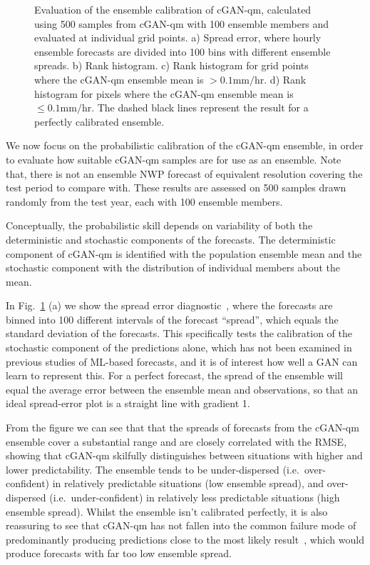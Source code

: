 \documentclass{article}
\begin{document}
\begin{figure}
     
     \caption{Evaluation of the ensemble calibration of cGAN-qm, calculated using 500 samples from cGAN-qm with 100 ensemble members and evaluated at individual grid points. a) Spread error, where hourly ensemble forecasts are divided into 100 bins with different ensemble spreads. b) Rank histogram. c) Rank histogram for grid points where the cGAN-qm ensemble mean is $>0.1\text{mm/hr}$. d) Rank histogram for pixels where the cGAN-qm ensemble mean is $\leq 0.1\text{mm/hr}$. The dashed black lines represent the result for a perfectly calibrated ensemble. }
     \label{fig:ens_calib}
\end{figure}


We now focus on the probabilistic calibration of the cGAN-qm ensemble, in order to evaluate how suitable cGAN-qm samples are for use as an ensemble. Note that, there is not an ensemble NWP forecast of equivalent resolution covering the test period to compare with. These results are assessed on 500 samples drawn randomly from the test year, each with 100 ensemble members. 

Conceptually, the probabilistic skill depends on variability of both the deterministic and stochastic components of the forecasts. The deterministic component of cGAN-qm is identified with the population ensemble mean and the stochastic component with the distribution of individual members about the mean.

In Fig.~\ref{fig:ens_calib} (a) we show the spread error diagnostic~\citep{leutbecher_ensemble_2008}, where the forecasts are binned into 100 different intervals of the forecast ``spread'', which equals the standard deviation of the forecasts. This specifically tests the calibration of the stochastic component of the predictions alone, which has not been examined in previous studies of ML-based forecasts, and it is of interest how well a GAN can learn to represent this. For a perfect forecast, the spread of the ensemble will equal the average error between the ensemble mean and observations, so that an ideal spread-error plot is a straight line with gradient 1.

From the figure we can see that that the spreads of forecasts from the cGAN-qm ensemble cover a substantial range and are closely correlated with the RMSE, showing that cGAN-qm skilfully distinguishes between situations with higher and lower predictability. The ensemble tends to be under-dispersed (i.e.~over-confident) in relatively predictable situations (low ensemble spread), and over-dispersed (i.e.~under-confident) in relatively less predictable situations (high ensemble spread). Whilst the ensemble isn't calibrated perfectly, it is also reassuring to see that cGAN-qm has not fallen into the common failure mode of predominantly producing predictions close to the most likely result~\cite{arjovsky_towards_2016}, which would produce forecasts with far too low ensemble spread.
\end{document}
